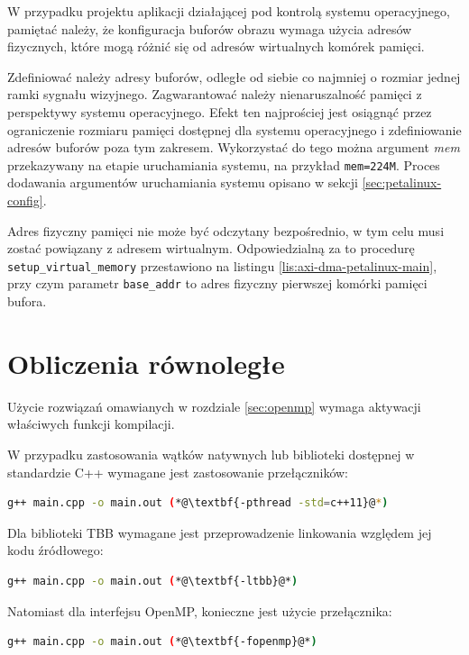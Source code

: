W przypadku projektu aplikacji działającej pod kontrolą systemu operacyjnego, pamiętać należy, że konfiguracja buforów obrazu wymaga użycia adresów fizycznych, które mogą różnić się od adresów wirtualnych komórek pamięci.

Zdefiniować należy adresy buforów, odległe od siebie co najmniej o rozmiar jednej ramki sygnału wizyjnego. Zagwarantować należy nienaruszalność pamięci z perspektywy systemu operacyjnego. Efekt ten najprościej jest osiągnąć przez ograniczenie rozmiaru pamięci dostępnej dla systemu operacyjnego i zdefiniowanie adresów buforów poza tym zakresem. Wykorzystać do tego można argument \textit{mem} przekazywany na etapie uruchamiania systemu, na przykład \texttt{mem=224M}. Proces dodawania argumentów uruchamiania systemu opisano w sekcji \ref{sec:petalinux-config}.

Adres fizyczny pamięci nie może być odczytany bezpośrednio, w tym celu musi zostać powiązany z adresem wirtualnym. Odpowiedzialną za to procedurę \texttt{setup\_virtual\_memory} przestawiono na listingu \ref{lis:axi-dma-petalinux-main}, przy czym parametr \texttt{base\_addr} to adres fizyczny pierwszej komórki pamięci bufora. 

\section{Obliczenia równoległe}

\label{sec:multithreading-config}
Użycie rozwiązań omawianych w rozdziale \ref{sec:openmp} wymaga aktywacji właściwych funkcji kompilacji.

W przypadku zastosowania wątków natywnych lub biblioteki dostępnej w standardzie C++ wymagane jest zastosowanie przełączników:

\begin{lstlisting}[language=bash]
g++ main.cpp -o main.out (*@\textbf{-pthread -std=c++11}@*)
\end{lstlisting}

Dla biblioteki TBB wymagane jest przeprowadzenie linkowania względem jej kodu źródłowego:

\begin{lstlisting}[language=bash]
g++ main.cpp -o main.out (*@\textbf{-ltbb}@*)
\end{lstlisting}

Natomiast dla interfejsu OpenMP, konieczne jest użycie przełącznika:

\begin{lstlisting}[language=bash]
g++ main.cpp -o main.out (*@\textbf{-fopenmp}@*)
\end{lstlisting}


